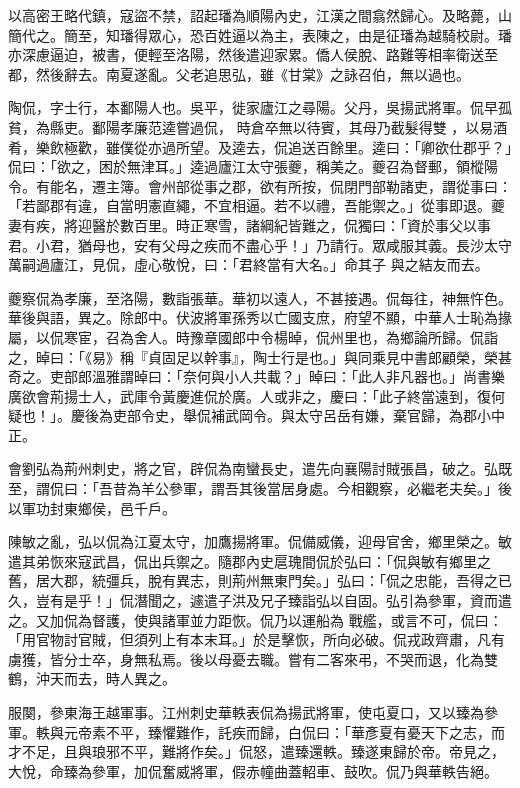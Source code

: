 \begin{pinyinscope}
 以高密王略代鎮，寇盜不禁，詔起璠為順陽內史，江漢之間翕然歸心。及略薨，山簡代之。簡至，知璠得眾心，恐百姓逼以為主，表陳之，由是征璠為越騎校尉。璠亦深慮逼迫，被書，便輕至洛陽，然後遣迎家累。僑人侯脫、路難等相率衛送至都，然後辭去。南夏遂亂。父老追思弘，雖《甘棠》之詠召伯，無以過也。


陶侃，字士行，本鄱陽人也。吳平，徙家廬江之尋陽。父丹，吳揚武將軍。侃早孤貧，為縣吏。鄱陽孝廉范逵嘗過侃，
 時倉卒無以待賓，其母乃截髮得雙
 ，以易酒肴，樂飲極歡，雖僕從亦過所望。及逵去，侃追送百餘里。逵曰：「卿欲仕郡乎？」侃曰：「欲之，困於無津耳。」逵過廬江太守張夔，稱美之。夔召為督郵，領樅陽令。有能名，遷主簿。會州部從事之郡，欲有所按，侃閉門部勒諸吏，謂從事曰：「若鄙郡有違，自當明憲直繩，不宜相逼。若不以禮，吾能禦之。」從事即退。夔妻有疾，將迎醫於數百里。時正寒雪，諸綱紀皆難之，侃獨曰：「資於事父以事君。小君，猶母也，安有父母之疾而不盡心乎！」乃請行。眾咸服其義。長沙太守萬嗣過廬江，見侃，虛心敬悅，曰：「君終當有大名。」命其子
 與之結友而去。



 夔察侃為孝廉，至洛陽，數詣張華。華初以遠人，不甚接遇。侃每往，神無忤色。華後與語，異之。除郎中。伏波將軍孫秀以亡國支庶，府望不顯，中華人士恥為掾屬，以侃寒宦，召為舍人。時豫章國郎中令楊晫，侃州里也，為鄉論所歸。侃詣之，晫曰：「《易》稱『貞固足以幹事』，陶士行是也。」與同乘見中書郎顧榮，榮甚奇之。吏部郎溫雅謂晫曰：「奈何與小人共載？」晫曰：「此人非凡器也。」尚書樂廣欲會荊揚士人，武庫令黃慶進侃於廣。人或非之，慶曰：「此子終當遠到，復何疑也！」。慶後為吏部令史，舉侃補武岡令。與太守呂岳有嫌，棄官歸，為郡小中正。



 會劉弘為荊州刺史，將之官，辟侃為南蠻長史，遣先向襄陽討賊張昌，破之。弘既至，謂侃曰：「吾昔為羊公參軍，謂吾其後當居身處。今相觀察，必繼老夫矣。」後以軍功封東鄉侯，邑千戶。



 陳敏之亂，弘以侃為江夏太守，加鷹揚將軍。侃備威儀，迎母官舍，鄉里榮之。敏遣其弟恢來寇武昌，侃出兵禦之。隨郡內史扈瑰間侃於弘曰：「侃與敏有鄉里之舊，居大郡，統彊兵，脫有異志，則荊州無東門矣。」弘曰：「侃之忠能，吾得之已久，豈有是乎！」侃潛聞之，遽遣子洪及兄子臻詣弘以自固。弘引為參軍，資而遣之。又加侃為督護，使與諸軍並力距恢。侃乃以運船為
 戰艦，或言不可，侃曰：「用官物討官賊，但須列上有本末耳。」於是擊恢，所向必破。侃戎政齊肅，凡有虜獲，皆分士卒，身無私焉。後以母憂去職。嘗有二客來弔，不哭而退，化為雙鶴，沖天而去，時人異之。



 服闋，參東海王越軍事。江州刺史華軼表侃為揚武將軍，使屯夏口，又以臻為參軍。軼與元帝素不平，臻懼難作，託疾而歸，白侃曰：「華彥夏有憂天下之志，而才不足，且與琅邪不平，難將作矣。」侃怒，遣臻還軼。臻遂東歸於帝。帝見之，大悅，命臻為參軍，加侃奮威將軍，假赤幢曲蓋軺車、鼓吹。侃乃與華軼告絕。




\end{pinyinscope}
